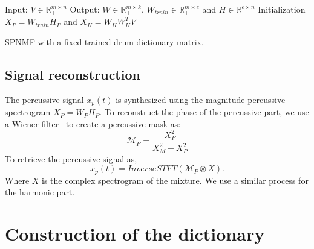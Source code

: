 \documentclass{article}
\begin{document}
\begin{algorithm}[h]
 Input: $V \in \mathbb{R}_{+}^{m \times n} $
 Output: $W \in \mathbb{R}_{+}^{m \times k}$, $W_{train} \in \mathbb{R}_+^{m \times e}$ and $H \in \mathbb{R}_{+}^{e \times n}$
 Initialization\;
 $ X_P = W_{train}H_P $ and
 $ X_H = W_HW_H^TV $ 
  
\vspace{0.2cm}
 \caption{SPNMF with a fixed trained drum dictionary matrix.}\label{AlgoDictionary}
\end{algorithm}




 
\subsection{Signal reconstruction}

The percussive signal $x_p(t)$ is synthesized using the magnitude percussive spectrogram $X_P = W_PH_P$. To reconstruct the phase of the percussive part, we use a Wiener filter~\cite{liutkus2015generalized} to create a percussive mask as:
\begin{equation}
\mathcal{M}_P = \frac{X_P^2}{X_M^2 + X_P^2}
\end{equation} 
To retrieve the percussive signal as, 
\begin{equation}
x_p(t) = InverseSTFT(\mathcal{M}_P \otimes X).
\end{equation}
Where $X$ is the complex spectrogram of the mixture.
We use a similar process for the harmonic part.
%




\section{Construction of the dictionary}\label{ConstrucDict}
\end{document}
